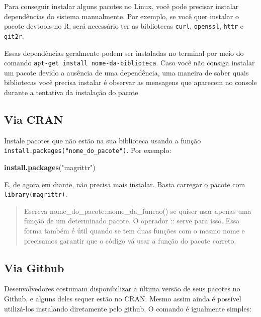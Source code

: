 \documentclass[
]{book}
\newenvironment{Shaded}{\begin{snugshade}}{\end{snugshade}}
\newcommand{\KeywordTok}[1]{\textcolor[rgb]{0.13,0.29,0.53}{\textbf{#1}}}
\newcommand{\NormalTok}[1]{#1}
\newcommand{\StringTok}[1]{\textcolor[rgb]{0.31,0.60,0.02}{#1}}
\begin{document}
Para conseguir instalar alguns pacotes no Linux, você pode precisar instalar dependências do sistema manualmente. Por exemplo, se você quer instalar o pacote devtools no R, será necessário ter as bibliotecas \texttt{curl}, \texttt{openssl}, \texttt{httr} e \texttt{git2r}.

Essas dependências geralmente podem ser instaladas no terminal por meio do comando \texttt{apt-get\ install\ nome-da-biblioteca}. Caso você não consiga instalar um pacote devido a ausência de uma dependência, uma maneira de saber quais bibliotecas você precisa instalar é observar as mensagens que aparecem no console durante a tentativa da instalação do pacote.

\hypertarget{via-cran}{%
\subsection{Via CRAN}\label{via-cran}}

Instale pacotes que não estão na sua biblioteca usando a função \texttt{install.packages("nome\_do\_pacote")}. Por exemplo:

\begin{Shaded}
\begin{Highlighting}[]
\KeywordTok{install.packages}\NormalTok{(}\StringTok{"magrittr"}\NormalTok{)}
\end{Highlighting}
\end{Shaded}

E, de agora em diante, não precisa mais instalar. Basta carregar o pacote com \texttt{library(magrittr)}.

\begin{quote}
Escreva nome\_do\_pacote::nome\_da\_funcao() se quiser usar apenas uma função de um determinado pacote. O operador :: serve para isso. Essa forma também é útil quando se tem duas funções com o mesmo nome e precisamos garantir que o código vá usar a função do pacote correto.
\end{quote}

\hypertarget{via-github}{%
\subsection{Via Github}\label{via-github}}

Desenvolvedores costumam disponibilizar a última versão de seus pacotes no Github, e alguns deles sequer estão no CRAN. Mesmo assim ainda é possível utilizá-los instalando diretamente pelo github. O comando é igualmente simples:
\end{document}
